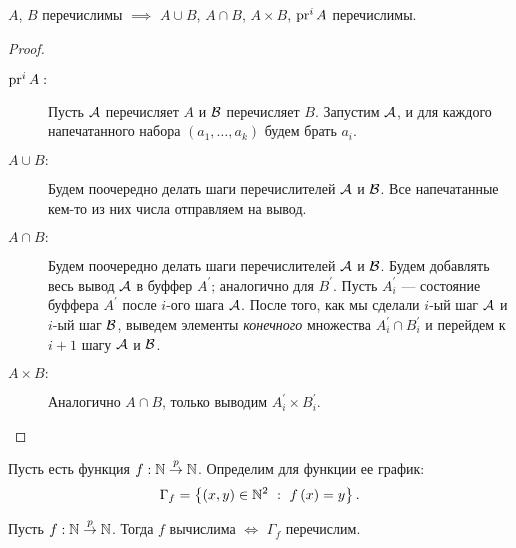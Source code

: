 \begin{statement}
    $A$, $B$ перечислимы $\implies$ $A \cup B$, $A \cap B$, $A \times B$, $\pr^{i} A$ перечислимы.
\end{statement}
\begin{proof}$ $
    \begin{description}
        \item[$\pr^{i} A:$] Пусть $\AA$ перечисляет $A$ и $\BB$ перечисляет $B$.
        Запустим $\AA$, и для каждого напечатанного набора $\left(a_{1}, \ldots, a_{k}\right)$ будем брать $a_{i}$.
        \item[$A \cup B:$] Будем поочередно делать шаги перечислителей $\AA$ и $\BB$.
        Все напечатанные кем-то из них числа отправляем на вывод.
        \item[$A \cap B:$] Будем поочередно делать шаги перечислителей $\AA$ и $\BB$.
        Будем добавлять весь вывод $\AA$ в буффер $A^{\prime}$; аналогично для $B^{\prime}$.
        Пусть $A_{i}^{\prime}$ --- состояние буффера $A^{\prime}$ после $i$-ого шага $\AA$.
        После того, как мы сделали $i$-ый шаг $\AA$ и $i$-ый шаг $\BB$, выведем элементы {\it конечного} множества $A^{\prime}_{i} \cap B^{\prime}_{i}$ и перейдем к $i + 1$ шагу $\AA$ и $\BB$.
        \item[$A \times B:$] Аналогично $A \cap B$, только выводим $A^{\prime}_{i} \times B^{\prime}_{i}$.
    \end{description}
\end{proof}

Пусть есть функция $f: \N \pto \N$.
Определим для функции ее график:
$$
    \Gamma_{f} = \left\{\left(x, y\right) \in \N^{2}~:~f\left(x\right) = y\right\}.
$$

\begin{theorem}
    Пусть $f: \N \pto \N$.
    Тогда $f$ вычислима $\iff$ $\Gamma_{f}$ перечислим.
\end{theorem}

